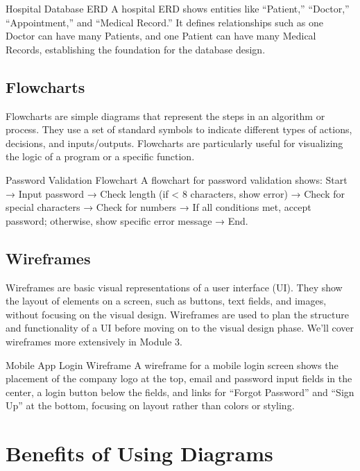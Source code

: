\begin{examplecard}{Hospital Database ERD}
  A hospital ERD shows entities like ``Patient,'' ``Doctor,'' ``Appointment,'' and ``Medical Record.'' It defines relationships such as one Doctor can have many Patients, and one Patient can have many Medical Records, establishing the foundation for the database design.
\end{examplecard}

\subsection{Flowcharts}

Flowcharts are simple diagrams that represent the steps in an algorithm or process. They use a set of standard symbols to indicate different types of actions, decisions, and inputs/outputs. Flowcharts are particularly useful for visualizing the logic of a program or a specific function.

\begin{examplecard}{Password Validation Flowchart}
  A flowchart for password validation shows: Start → Input password → Check length (if < 8 characters, show error) → Check for special characters → Check for numbers → If all conditions met, accept password; otherwise, show specific error message → End.
\end{examplecard}

\subsection{Wireframes}

Wireframes are basic visual representations of a user interface (UI). They show the layout of elements on a screen, such as buttons, text fields, and images, without focusing on the visual design. Wireframes are used to plan the structure and functionality of a UI before moving on to the visual design phase. We'll cover wireframes more extensively in Module 3.

\begin{examplecard}{Mobile App Login Wireframe}
  A wireframe for a mobile login screen shows the placement of the company logo at the top, email and password input fields in the center, a login button below the fields, and links for ``Forgot Password'' and ``Sign Up'' at the bottom, focusing on layout rather than colors or styling.
\end{examplecard}

\section{Benefits of Using Diagrams}

